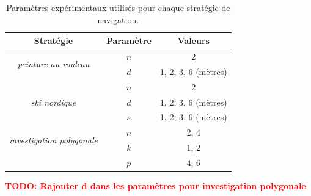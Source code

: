\documentclass[francais,RandD]{rapportPFE}
\newcommand{\TODO}[1]{\textcolor{red}{\textbf{TODO: #1}}}
\begin{document}
		\begin{table}[h!]
			\centering
			\begin{tabular}{|c|c|c|}
				\hline
				Stratégie & Paramètre & Valeurs \\
				\hline
				\multirow{2}{*}{\textit{peinture au rouleau}} & $n$ & 2 \\
				& $d$ & 1, 2, 3, 6 (mètres) \\
				\hline
				\multirow{3}{*}{\textit{ski nordique}} & $n$ & 2 \\
				& $d$ & 1, 2, 3, 6 (mètres) \\
				& $s$ & 1, 2, 3, 6 (mètres) \\
				\hline
				\multirow{2}{*}{\textit{investigation polygonale}} & $n$ & 2, 4 \\
				& $k$ & 1, 2 \\
				& $p$ & 4, 6 \\
				\hline
			\end{tabular}
			\caption{Paramètres expérimentaux utilisés pour chaque stratégie de navigation.}
			\label{tab:exp_params}
		\end{table}

		\TODO{Rajouter d dans les paramètres pour investigation polygonale}
\end{document}
